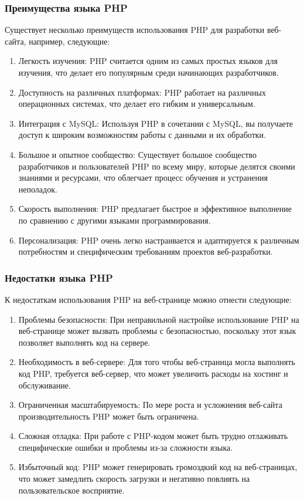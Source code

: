 \subsubsection{Преимущества языка PHP}

Существует несколько преимуществ использования PHP для разработки веб-сайта, например, следующие:

\begin{enumerate}
	\item Легкость изучения: PHP считается одним из самых простых языков для изучения, что делает его популярным среди начинающих разработчиков.
	\item Доступность на различных платформах: PHP работает на различных операционных системах, что делает его гибким и универсальным.
	\item Интеграция с MySQL: Используя PHP в сочетании с MySQL, вы получаете доступ к широким возможностям работы с данными и их обработки.
	\item Большое и опытное сообщество: Существует большое сообщество разработчиков и пользователей PHP по всему миру, которые делятся своими знаниями и ресурсами, что облегчает процесс обучения и устранения неполадок.
	\item Скорость выполнения: PHP предлагает быстрое и эффективное выполнение по сравнению с другими языками программирования.
	\item Персонализация: PHP очень легко настраивается и адаптируется к различным потребностям и специфическим требованиям проектов веб-разработки.
\end{enumerate}

\subsubsection{Недостатки языка PHP}

К недостаткам использования PHP на веб-странице можно отнести следующие:

\begin{enumerate}
	\item Проблемы безопасности: При неправильной настройке использование PHP на веб-странице может вызвать проблемы с безопасностью, поскольку этот язык позволяет выполнять код на сервере.
	\item Необходимость в веб-сервере: Для того чтобы веб-страница могла выполнять код PHP, требуется веб-сервер, что может увеличить расходы на хостинг и обслуживание.
	\item Ограниченная масштабируемость: По мере роста и усложнения веб-сайта производительность PHP может быть ограничена.
	\item Сложная отладка: При работе с PHP-кодом может быть трудно отлаживать специфические ошибки и проблемы из-за сложности языка.
	\item Избыточный код: PHP может генерировать громоздкий код на веб-страницах, что может замедлить скорость загрузки и негативно повлиять на пользовательское восприятие.
\end{enumerate}

